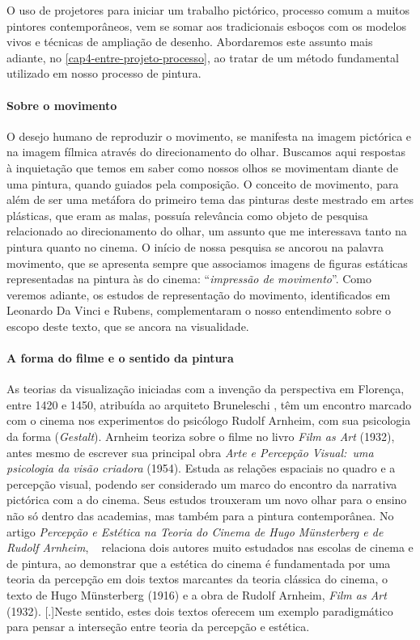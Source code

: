 O uso de projetores para iniciar um trabalho pictórico, processo comum
a muitos pintores contemporâneos, vem se somar aos tradicionais esboços
com os modelos vivos e técnicas de ampliação de desenho. Abordaremos
este assunto mais adiante, no \cref{cap4-entre-projeto-processo}, ao tratar de um método
fundamental utilizado em nosso processo de pintura.

\paragraph{Sobre o movimento} O desejo humano de reproduzir o movimento, se manifesta na imagem
pictórica e na imagem fílmica através do direcionamento do olhar.
Buscamos aqui respostas à inquietação que temos em saber como nossos
olhos se movimentam diante de uma pintura, quando guiados pela
composição. O conceito de movimento, para além de ser uma metáfora do
primeiro tema das pinturas deste mestrado em artes plásticas, que eram
as malas, possuía relevância como objeto de pesquisa relacionado ao
direcionamento do olhar, um assunto que me interessava tanto na pintura
quanto no cinema. O início de nossa pesquisa se ancorou na palavra
movimento, que se apresenta sempre que associamos imagens de figuras
estáticas representadas na pintura às do cinema:
\enquote{\emph{impressão de movimento}}. Como veremos adiante, os
estudos de representação do movimento, identificados em Leonardo Da
Vinci e Rubens, complementaram o nosso entendimento sobre o escopo
deste texto, que se ancora na visualidade.

\paragraph{A forma do filme e o sentido da pintura}
As teorias da visualização iniciadas com a invenção da perspectiva em
Florença, entre 1420 e 1450, atribuída ao arquiteto Bruneleschi
\parencite{arasse2016historias}, têm um encontro marcado com o cinema nos experimentos
do psicólogo Rudolf Arnheim, com sua psicologia da forma
(\emph{Gestalt}). Arnheim teoriza sobre o filme no livro \emph{Film as
	Art} (1932), antes mesmo de escrever sua principal obra \emph{Arte e
	Percepção Visual:~uma psicologia da visão criadora} (1954).
Estuda as relações espaciais no quadro e a percepção visual,
podendo ser considerado um marco do encontro da narrativa pictórica com
a do cinema. Seus estudos trouxeram um novo olhar para o ensino não só
dentro das academias, mas também para a pintura contemporânea. No
artigo \emph{Percepção e Estética na Teoria do Cinema de Hugo
	Münsterberg e de Rudolf Arnheim}, \citeauthor{pedro2013percepcao}~\cite*{pedro2013percepcao}
relaciona dois autores muito estudados nas escolas de cinema e de pintura, ao
demonstrar que a estética do cinema é fundamentada por uma teoria da
percepção em dois textos marcantes da teoria clássica do cinema, o
texto de Hugo Münsterberg (1916) e a obra de Rudolf Arnheim, \emph{Film
	as Art} (1932). {Neste sentido,
	estes dois textos oferecem um exemplo paradigmático para pensar a
	interseção entre teoria da percepção e estética}.

